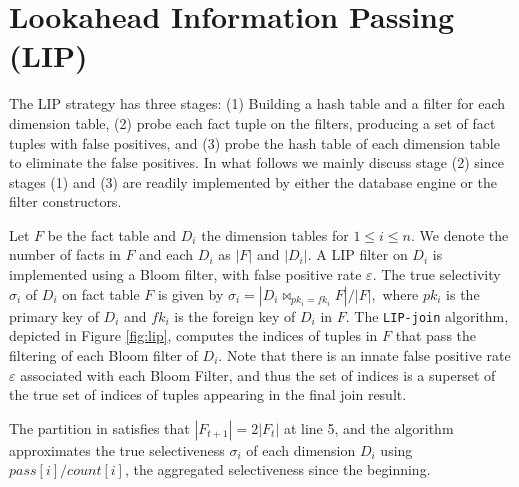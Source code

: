 \documentclass[10pt]{article}
\newcommand{\JOIN}{\bowtie}
\begin{document}
\section{Lookahead Information Passing (LIP)}

The LIP strategy has three stages: (1) Building a hash table and a filter for each dimension table, (2) probe each fact tuple on the filters, producing a set of fact tuples with false positives, and (3) probe the hash table of each dimension table to eliminate the false positives. In what follows we mainly discuss stage (2) since stages (1) and (3) are readily implemented by either the database engine or the filter constructors.

Let $F$ be the fact table and $D_i$ the dimension tables for $1 \leq i \leq n$. We denote the number of facts in $F$ and each $D_i$ as $|F|$ and $|D_i|$. A LIP filter on $D_i$ is implemented using a Bloom filter, with false positive rate $\varepsilon$. The true selectivity $\sigma_i$ of $D_i$ on fact table $F$ is given by $\sigma_i = |D_i \JOIN_{pk_i = fk_i} F| / |F|,$ where $pk_i$ is the primary key of $D_i$ and $fk_i$ is the foreign key of $D_i$ in $F$. The \texttt{LIP-join} algorithm, depicted in Figure \ref{fig:lip}, computes the indices of tuples in $F$ that pass the filtering of each Bloom filter of $D_i$. Note that there is an innate false positive rate $\varepsilon$ associated with each Bloom Filter, and thus the set of indices is a superset of the true set of indices of tuples appearing in the final join result.

The partition in \cite{zhu2017looking} satisfies that $|F_{t+1}| = 2|F_{t}|$ at line 5, and the algorithm approximates the true selectiveness $\sigma_i$ of each dimension $D_i$ using $pass[i]/count[i]$, the aggregated selectiveness since the beginning.
\end{document}
